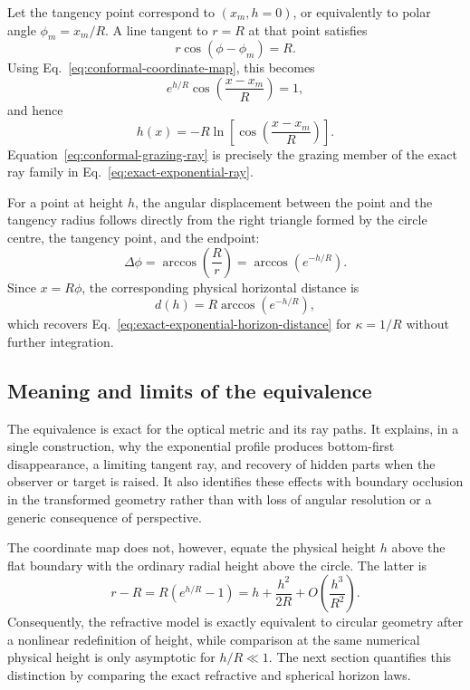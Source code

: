 Let the tangency point correspond to $(x_m,h=0)$, or equivalently to polar
angle $\phi_m=x_m/R$. A line tangent to $r=R$ at that point satisfies
\begin{equation}
    r\cos\!\left(\phi-\phi_m\right)=R.
    \label{eq:tangent-line-polar-form}
\end{equation}
Using Eq.~\eqref{eq:conformal-coordinate-map}, this becomes
\begin{equation}
    e^{h/R}
    \cos\!\left(\frac{x-x_m}{R}\right)=1,
\end{equation}
and hence
\begin{equation}
    h(x)
    =
    -R\ln\!\left[
        \cos\!\left(\frac{x-x_m}{R}\right)
    \right].
    \label{eq:conformal-grazing-ray}
\end{equation}
Equation~\eqref{eq:conformal-grazing-ray} is precisely the grazing member of
the exact ray family in Eq.~\eqref{eq:exact-exponential-ray}.

For a point at height $h$, the angular displacement between the point and the
tangency radius follows directly from the right triangle formed by the circle
centre, the tangency point, and the endpoint:
\begin{equation}
    \Delta\phi
    =
    \arccos\!\left(\frac{R}{r}\right)
    =
    \arccos\!\left(e^{-h/R}\right).
    \label{eq:conformal-horizon-angle}
\end{equation}
Since $x=R\phi$, the corresponding physical horizontal distance is
\begin{equation}
    d(h)
    =
    R\arccos\!\left(e^{-h/R}\right),
\end{equation}
which recovers Eq.~\eqref{eq:exact-exponential-horizon-distance} for
$\kappa=1/R$ without further integration.

\subsection{Meaning and limits of the equivalence}

The equivalence is exact for the optical metric and its ray paths.
It explains, in a single construction, why the exponential profile produces
bottom-first disappearance, a limiting tangent ray, and recovery of hidden
parts when the observer or target is raised. It also identifies these effects
with boundary occlusion in the transformed geometry rather than with loss of angular resolution or a generic consequence
of perspective.

The coordinate map does not, however, equate the physical height $h$ above
the flat boundary with the ordinary radial height above the circle. The
latter is
\begin{equation}
    r-R
    =
    R\left(e^{h/R}-1\right)
    =
    h+\frac{h^2}{2R}+O\!\left(\frac{h^3}{R^2}\right).
    \label{eq:radial-height-map}
\end{equation}
Consequently, the refractive model is exactly equivalent to circular
geometry after a nonlinear redefinition of height, while comparison at the
same numerical physical height is only asymptotic for $h/R\ll 1$. The next
section quantifies this distinction by comparing the exact refractive and
spherical horizon laws.
